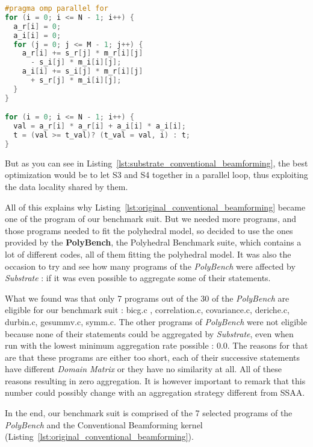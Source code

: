 \documentclass[paper=a4, fontsize=11.5pt]{scrartcl}
\numberwithin{equation}{section}        %
\numberwithin{figure}{section}          %
\numberwithin{table}{section}               %
\begin{document}
\hfill
\begin{minipage}[t]{0.45\textwidth}
\begin{lstlisting}[frame=single, language=C, basicstyle=\scriptsize, caption={Goal version of Conventional Beamforming kernel}, label={lst:substrate_conventional_beamforming}]
#pragma omp parallel for
for (i = 0; i <= N - 1; i++) {
  a_r[i] = 0;
  a_i[i] = 0;
  for (j = 0; j <= M - 1; j++) {
    a_r[i] += s_r[j] * m_r[i][j]
      - s_i[j] * m_i[i][j];
    a_i[i] += s_i[j] * m_r[i][j]
      + s_r[j] * m_i[i][j];
  }
}

for (i = 0; i <= N - 1; i++) {
  val = a_r[i] * a_r[i] + a_i[i] * a_i[i];
  t = (val >= t_val)? (t_val = val, i) : t;
}
\end{lstlisting}
\end{minipage}
But as you can see in Listing~\ref{lst:substrate_conventional_beamforming}, the best optimization
would be to let S3 and S4 together in a parallel loop, thus exploiting the data locality
shared by them.

\bigskip

All of this explains why Listing~\ref{lst:original_conventional_beamforming} became one
of the program of our benchmark suit. But we needed more programs, and those programs needed to
fit the polyhedral model, so decided to use the ones provided by the \textbf{PolyBench},
the Polyhedral Benchmark suite, which contains a lot of different codes, all of them fitting
the polyhedral model. It was also the occasion to try and see how many programs of the \textit{PolyBench}
were affected by \textit{Substrate} : if it was even possible to aggregate some of their statements.

What we found was that only 7 programs out of the 30 of the \textit{PolyBench} are eligible
 for our benchmark suit : bicg.c , correlation.c, covariance.c, deriche.c, durbin.c, gesummv.c, symm.c.
The other programs of \textit{PolyBench} were not eligible because none of their statements could be
aggregated by \textit{Substrate}, even when run with the lowest minimum aggregation rate possible : 0.0.
The reasons for that are that these programs are either too short, each of their
successive statements have different \textit{Domain Matrix} or they have no similarity at all.
All of these reasons resulting in zero aggregation. It is however important to remark that
this number could possibly change with an aggregation strategy different from SSAA.

\bigskip

In the end, our benchmark suit is comprised of the 7 selected programs of the \textit{PolyBench}
and the Conventional Beamforming kernel (Listing~\ref{lst:original_conventional_beamforming}).
\end{document}
